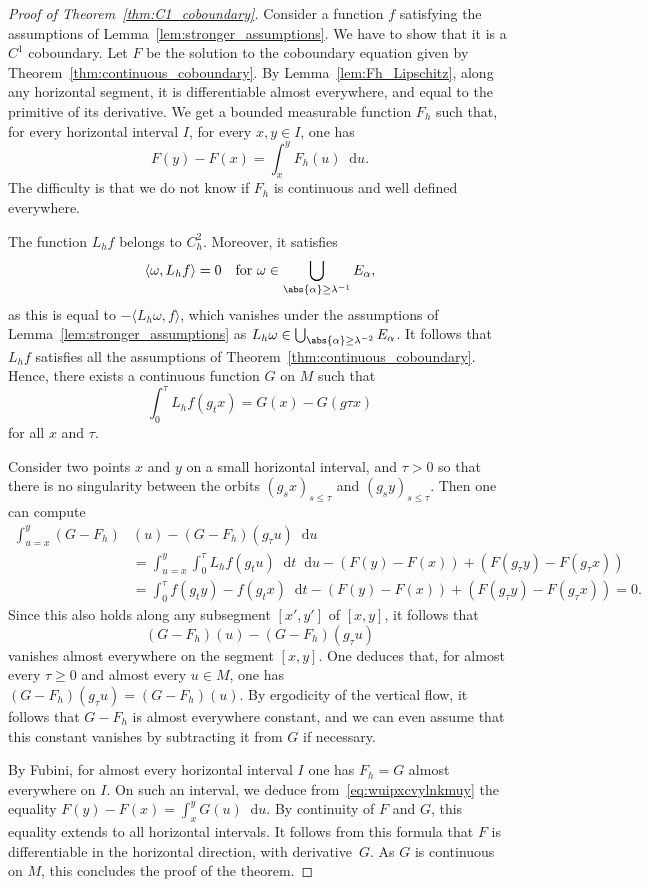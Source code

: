 \documentclass[JEP,XML,SOM,Unicode]{cedram}
\newcommand{\dd}{\mathop{}\!\mathrm{d}}
\theoremstyle{definition}
\numberwithin{equation}{section}
\begin{document}
\begin{proof}[Proof of Theorem~\ref{thm:C1_coboundary}]
Consider a function $f$ satisfying the assumptions of
Lem\-ma~\ref{lem:stronger_assumptions}. We have to show that it is a $C^1$
coboundary. Let $F$ be the solution to the coboundary equation given by
Theorem~\ref{thm:continuous_coboundary}. By Lemma~\ref{lem:Fh_Lipschitz},
along any horizontal segment, it is differentiable almost everywhere, and
equal to the primitive of its derivative. We get a bounded measurable
function $F_h$ such that, for every horizontal interval $I$, for every $x,
y\in I$, one has
\begin{equation}
\label{eq:wuipxcvylnkmuy}
F(y)-F(x) = \int_x^y F_h(u) \dd u.
\end{equation}
The difficulty is that we do not know if $F_h$ is continuous and well defined
everywhere.

The function $L_h f$ belongs to $C^2_h$. Moreover, it satisfies
\[
\langle
\omega, L_h f\rangle = 0\quad\text{for }\omega \in \bigcup_{\abs{\alpha} \geq
\lambda^{-1}} E_\alpha,
\]
as this is equal to $-\langle L_h \omega, f\rangle$,
which vanishes under the assumptions of Lemma~\ref{lem:stronger_assumptions}
as $L_h \omega \in \bigcup_{\abs{\alpha} \geq \lambda^{-2}} E_\alpha$. It
follows that $L_h f$ satisfies all the assumptions of
Theorem~\ref{thm:continuous_coboundary}. Hence, there exists a continuous
function $G$ on $M$ such that
\[
\int_0^\tau L_h f(g_t x) = G(x)-G(g\tau x)
\]
for all $x$ and $\tau$.

Consider two points $x$ and $y$ on a small horizontal interval, and $\tau>0$
so that there is no singularity between the orbits $(g_s x)_{s\leq \tau}$ and
$(g_s y)_{s\leq \tau}$. Then one can compute
\begin{align*}
\int_{u=x}^y (G-F_h)&(u) - (G-F_h)(g_\tau u) \dd u
\\[-5pt]
&= \int_{u=x}^y \int_0^\tau L_h f(g_t u) \dd t \dd u - (F(y)-F(x)) + (F(g_\tau y) - F(g_\tau x))
\\& = \int_0^\tau f(g_t y) - f(g_t x) \dd t - (F(y)-F(x)) + (F(g_\tau y) - F(g_\tau x))
= 0.
\end{align*}
Since this also holds along any subsegment $[x',y']$ of $[x,y]$, it follows
that
\[
(G-F_h)(u) - (G-F_h)(g_\tau u)
\]
vanishes almost everywhere on the
segment $[x,y]$. One deduces that, for almost every $\tau \geq 0$ and almost
every $u\in M$, one has $(G-F_h)(g_\tau u) = (G-F_h)(u)$. By ergodicity of
the vertical flow, it follows that $G-F_h$ is almost everywhere constant, and
we can even assume that this constant vanishes by subtracting it from $G$ if
necessary.

By Fubini, for almost every horizontal interval $I$ one has $F_h = G$ almost
everywhere on $I$. On such an interval, we deduce
from~\eqref{eq:wuipxcvylnkmuy} the equality $F(y)-F(x) = \int_x^y G(u) \dd
u$. By continuity of $F$ and $G$, this equality extends to all horizontal
intervals. It follows from this formula that $F$ is differentiable in the
horizontal direction, with derivative~$G$. As $G$ is continuous on $M$, this
concludes the proof of the theorem.
\end{proof}
\end{document}
